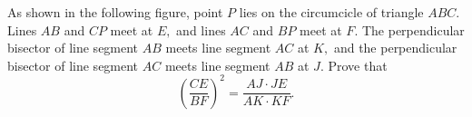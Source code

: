 As shown in the following figure, point $ P$ lies on the circumcicle of triangle $ ABC.$ Lines $ AB$ and $ CP$ meet at $ E,$ and lines $ AC$ and $ BP$ meet at $ F.$ The perpendicular bisector of line segment $ AB$ meets line segment $ AC$ at $ K,$ and the perpendicular bisector of line segment $ AC$ meets line segment $ AB$ at $ J.$ Prove that\[ \left(\frac{CE}{BF} \right)^2 = \frac{AJ \cdot JE}{AK \cdot KF}.\]